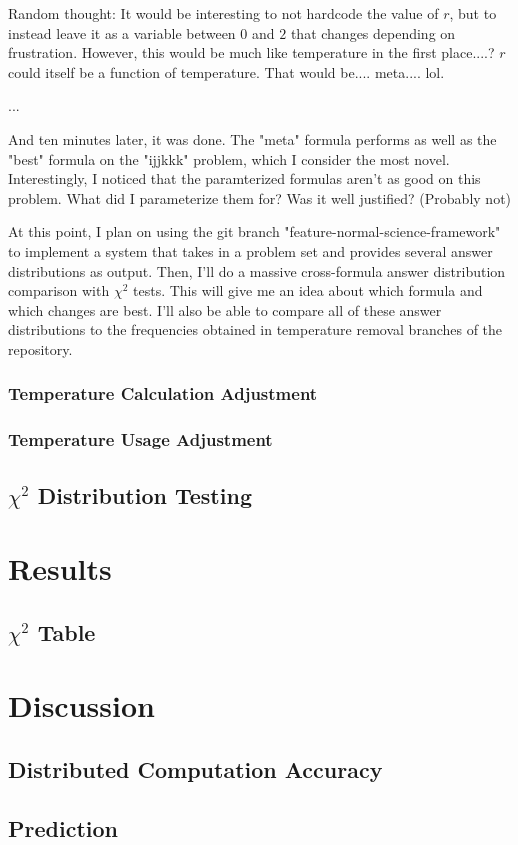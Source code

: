 \documentclass[a4paper]{article}
\begin{document}
            

            Random thought:
            It would be interesting to not hardcode the value of $r$, but to instead leave it as a variable between $0$ and $2$ that changes depending on frustration.
            However, this would be much like temperature in the first place....?
            $r$ could itself be a function of temperature. That would be.... meta.... lol.

            \break
            ...
            \break

            And ten minutes later, it was done.
            The "meta" formula performs as well as the "best" formula on the "ijjkkk" problem, which I consider the most novel.
            Interestingly, I noticed that the paramterized formulas aren't as good on this problem. What did I parameterize them for? Was it well justified?
            (Probably not)

            At this point, I plan on using the git branch "feature-normal-science-framework" to implement a system that takes in a problem set and provides several answer distributions as output.
            Then, I'll do a massive cross-formula answer distribution comparison with $\chi^2$ tests. This will give me an idea about which formula and which changes are best.
            I'll also be able to compare all of these answer distributions to the frequencies obtained in temperature removal branches of the repository.
            
        \subsubsection{Temperature Calculation Adjustment}
        \subsubsection{Temperature Usage Adjustment}
    \subsection{$\chi^2$ Distribution Testing}
\section{Results}
    \subsection{$\chi^2$ Table}
\section{Discussion}
    \subsection{Distributed Computation Accuracy}
    \subsection{Prediction}



\end{document}
